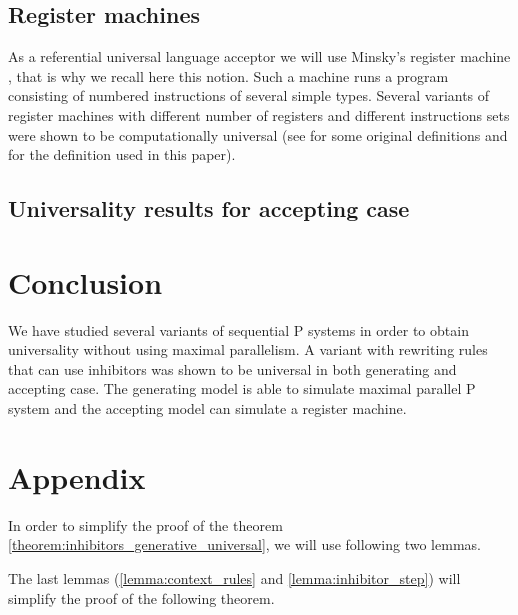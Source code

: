 \documentclass[llncs,submission,copyright,creativecommons]{../lib/lncs/llncs}
\begin{document}

\subsection{Register machines} %
\label{sub:register_machines}
  As a referential universal language acceptor we will use Minsky's register machine \cite{Ionescu:jucs_10_5:on_p_systems_with}, that is why we recall here this notion. Such a machine runs a program consisting of numbered instructions of several simple types. Several variants of register machines with different number of registers and different instructions sets were shown to be computationally universal (see \cite{Ibarra:2005:SPS:2111772.2111880} for some original definitions and \cite{Khrisna03threeuniversality} for the definition used in this paper).


  

\subsection{Universality results for accepting case} %
\label{sub:universality_results_for_accepting_case}




\section{Conclusion}
\label{sec:conclusion}
We have studied several variants of sequential P systems in order to obtain universality without using maximal parallelism.
A variant with rewriting rules that can use inhibitors was shown to be universal in both generating and accepting case. The generating model is able to simulate maximal parallel P system and the accepting model can simulate a register machine.


\section{Appendix} %
\label{sec:appendix}

In order to simplify the proof of the theorem \ref{theorem:inhibitors_generative_universal}, we will use following two lemmas.


The last lemmas (\ref{lemma:context_rules} and \ref{lemma:inhibitor_step}) will simplify the proof of the following theorem.


\end{document}
